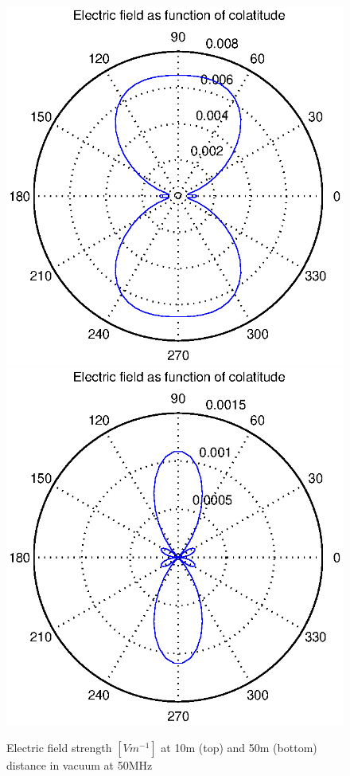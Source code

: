 \documentclass[a4paper,11pt]{thesis}
\begin{document}
\begin{figure}
\begin{center}
  \includegraphics[width=11.5cm]{DissPics/NFvac10m50MHz.eps}
\includegraphics[width=11.5cm]{DissPics/NFvac50m50MHz.eps}
  \caption{Electric field strength $[Vm^{-1}]$ at 10m (top) and 50m (bottom) distance in vacuum at 50MHz}\label{figNFvac10m50MHz}
  \end{center}
\end{figure}
\end{document}
